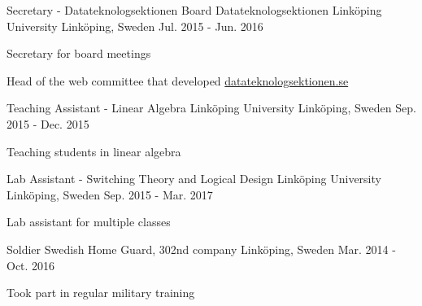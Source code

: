

\begin{cventries}

  \cventry
    {Secretary - Datateknologsektionen Board} %
    {Datateknologsektionen Linköping University} %
    {Linköping, Sweden} %
    {Jul. 2015 - Jun. 2016} %
    {
      \begin{cvitems} %
        \item {Secretary for board meetings}
        \item {Head of the web committee that developed \href{https://d-sektionen.se/}{datateknologsektionen.se}}
      \end{cvitems}
    }

  \cventry
  {Teaching Assistant - Linear Algebra} %
  {Linköping University} %
  {Linköping, Sweden} %
  {Sep. 2015 - Dec. 2015} %
  {
    \begin{cvitems} %
      \item {Teaching students in linear algebra}
    \end{cvitems}
  }


  \cventry
  {Lab Assistant - Switching Theory and Logical Design} %
  {Linköping University} %
  {Linköping, Sweden} %
  {Sep. 2015 - Mar. 2017} %
  {
    \begin{cvitems} %
      \item {Lab assistant for multiple classes}
    \end{cvitems}
  }


  \cventry
  {Soldier} %
  {Swedish Home Guard, 302nd company} %
  {Linköping, Sweden} %
  {Mar. 2014 - Oct. 2016} %
  {
    \begin{cvitems} %
      \item {Took part in regular military training}
    \end{cvitems}
  }


\end{cventries}
